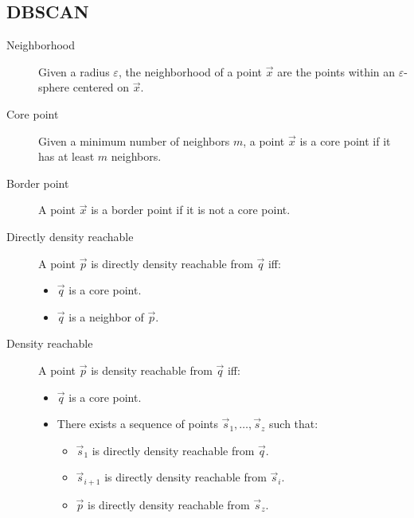 \subsection{DBSCAN}

\begin{description}
    \item[Neighborhood] 
        Given a radius $\varepsilon$, the neighborhood of a point $\vec{x}$ are the points within an $\varepsilon$-sphere centered on $\vec{x}$.

    \item[Core point] 
        Given a minimum number of neighbors $m$, 
        a point $\vec{x}$ is a core point if it has at least $m$ neighbors.

    \item[Border point] 
        A point $\vec{x}$ is a border point if it is not a core point.

    \item[Directly density reachable] 
        A point $\vec{p}$ is directly density reachable from $\vec{q}$ iff:
        \begin{itemize}
            \item $\vec{q}$ is a core point.
            \item $\vec{q}$ is a neighbor of $\vec{p}$.
        \end{itemize}

    \item[Density reachable] 
        A point $\vec{p}$ is density reachable from $\vec{q}$ iff:
        \begin{itemize}
            \item $\vec{q}$ is a core point.
            \item There exists a sequence of points $\vec{s}_1, \dots, \vec{s}_z$ such that:
            \begin{itemize}
                \item $\vec{s}_1$ is directly density reachable from $\vec{q}$.
                \item $\vec{s}_{i+1}$ is directly density reachable from $\vec{s}_i$.
                \item $\vec{p}$ is directly density reachable from $\vec{s}_z$.
            \end{itemize}
        \end{itemize}


\end{description}
